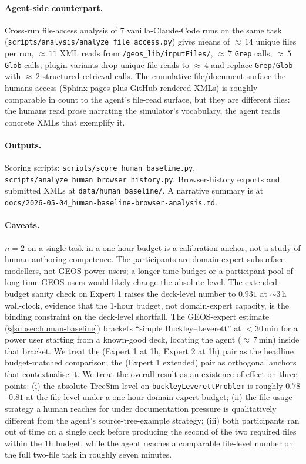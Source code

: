 \documentclass{article}
\begin{document}
\paragraph{Agent-side counterpart.} Cross-run file-access analysis of $7$ vanilla-Claude-Code runs on the same task (\texttt{scripts/analysis/analyze\_file\_access.py}) gives means of ${\approx}\,14$ unique files per run, ${\approx}\,11$ XML reads from \texttt{/geos\_lib/inputFiles/}, ${\approx}\,7$ \texttt{Grep} calls, ${\approx}\,5$ \texttt{Glob} calls; plugin variants drop unique-file reads to ${\approx}\,4$ and replace \texttt{Grep}/\texttt{Glob} with ${\approx}\,2$ structured retrieval calls. The cumulative file/document surface the humans access (Sphinx pages plus GitHub-rendered XMLs) is roughly comparable in count to the agent's file-read surface, but they are different files: the humans read prose narrating the simulator's vocabulary, the agent reads concrete XMLs that exemplify it.

\paragraph{Outputs.} Scoring scripts: \texttt{scripts/score\_human\_baseline.py}, \texttt{scripts/analyze\_human\_browser\_history.py}. Browser-history exports and submitted XMLs at \texttt{data/human\_baseline/}. A narrative summary is at \texttt{docs/2026-05-04\_human-baseline-browser-analysis.md}.

\paragraph{Caveats.} $n=2$ on a single task in a one-hour budget is a calibration anchor, not a study of human authoring competence. The participants are domain-expert subsurface modellers, not GEOS power users; a longer-time budget or a participant pool of long-time GEOS users would likely change the absolute level. The extended-budget sanity check on Expert 1 raises the deck-level number to $0.931$ at $\sim\!3\,$h wall-clock, evidence that the 1-hour budget, not domain-expert capacity, is the binding constraint on the deck-level shortfall. The GEOS-expert estimate (\S\ref{subsec:human-baseline}) brackets ``simple Buckley--Leverett'' at ${<}30\,$min for a power user starting from a known-good deck, locating the agent (${\approx}\,7\,$min) inside that bracket. We treat the (Expert 1 at 1h, Expert 2 at 1h) pair as the headline budget-matched comparison; the (Expert 1 extended) pair as orthogonal anchors that contextualise it. We treat the overall result as an existence-of-effect on three points: (i) the absolute TreeSim level on \texttt{buckleyLeverettProblem} is roughly $0.78$--$0.81$ at the file level under a one-hour domain-expert budget; (ii) the file-usage strategy a human reaches for under documentation pressure is qualitatively different from the agent's source-tree-example strategy; (iii) both participants ran out of time on a single deck before producing the second of the two required files within the 1h budget, while the agent reaches a comparable file-level number on the full two-file task in roughly seven minutes.
\end{document}
